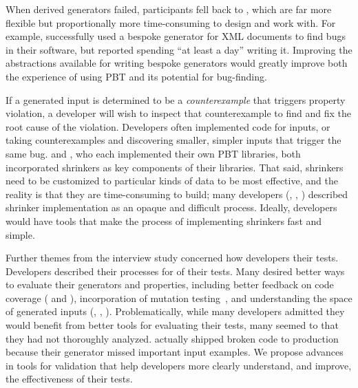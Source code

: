 When derived generators
failed, participants fell back to , which
are far more flexible but proportionally more time-consuming to design and work
with. For example,  successfully used a bespoke
generator for XML documents to find bugs in their software,
but reported spending ``at least a day'' writing it.
Improving the abstractions available for writing bespoke generators would
greatly improve both the experience of using PBT and its potential for
bug-finding.

If a generated input is determined to be a {\em counterexample} that triggers
property violation, a developer will wish to inspect that counterexample to find 
and fix the root cause of the violation. Developers often implemented code for 
 inputs, or taking counterexamples and discovering smaller, 
simpler inputs that trigger the same bug.  
and , who each implemented their own PBT libraries, both
incorporated shrinkers as key components of their libraries. That said, 
shrinkers need to be customized to particular kinds of data to be most 
effective, and the reality is that they are time-consuming to build; many 
developers
(,  , ) 
described shrinker implementation as an opaque and difficult process.
Ideally, developers would have tools that make the process of implementing 
shrinkers fast and simple.

Further themes from the interview study concerned how developers 
 their tests.
Developers described their processes for  of their tests. Many
desired
better ways to evaluate their generators and properties, including
better feedback on code coverage ( and ), 
incorporation of mutation
testing~\cite{papadakis_mutation_2018}, and understanding the space of generated 
inputs (, , ). Problematically, 
while many developers admitted they would benefit from better tools for 
evaluating their tests, many seemed to
 that they had not thoroughly
analyzed.  actually shipped broken code to production because
their generator missed important input examples. We propose advances in tools 
for validation that help developers more clearly understand, and improve, the 
effectiveness of their tests.

